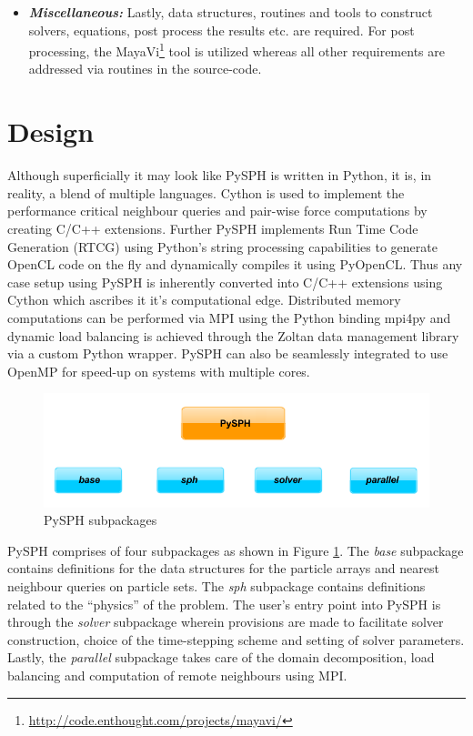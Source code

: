 \begin{itemize}
\item \textbf{\textit{Miscellaneous: }}Lastly, data structures, routines and tools to construct solvers, equations, post process the results etc. are required. For post processing, the MayaVi\footnote[7]{\url{http://code.enthought.com/projects/mayavi/}} tool is utilized whereas all other requirements are addressed via routines in the source-code.
\end{itemize} 

\section{Design}

Although superficially it may look like PySPH is written in Python, it is, in reality, a blend of multiple languages. Cython is used to implement the performance critical neighbour queries and pair-wise force computations by creating C/C++ extensions. Further PySPH implements Run Time Code Generation (RTCG) using Python's string processing capabilities to generate OpenCL code on the fly and dynamically compiles it using PyOpenCL\cite{PyOpenCL}. Thus any case setup using PySPH is inherently converted into C/C++ extensions using Cython which ascribes it it's computational edge. Distributed memory computations can be performed via MPI using the Python binding mpi4py \cite{mpi4py} and dynamic load balancing is achieved through the Zoltan data management library \cite{zoltan} via a custom Python wrapper. PySPH can also be seamlessly integrated to use OpenMP for speed-up on systems with multiple cores.

\begin{figure}[htb!]
\centering
\setlength\fboxsep{0pt}
      \includegraphics[scale=0.35]{figures/pysph_modules.png} 
\caption{{\small{PySPH subpackages}}}
\label{fig:pysph_modules}
\end{figure}

PySPH comprises of four subpackages as shown in Figure \ref{fig:pysph_modules}. The \textit{base} subpackage contains definitions for the data structures for the particle arrays and nearest neighbour queries on particle sets. The \textit{sph} subpackage contains definitions related to the ``physics'' of the problem. The user's entry point into PySPH is through the  \textit{solver} subpackage wherein provisions are made to facilitate solver construction, choice of the time-stepping scheme and setting of solver parameters. Lastly, the \textit{parallel} subpackage takes care of the domain decomposition, load balancing and computation of remote neighbours using MPI.

